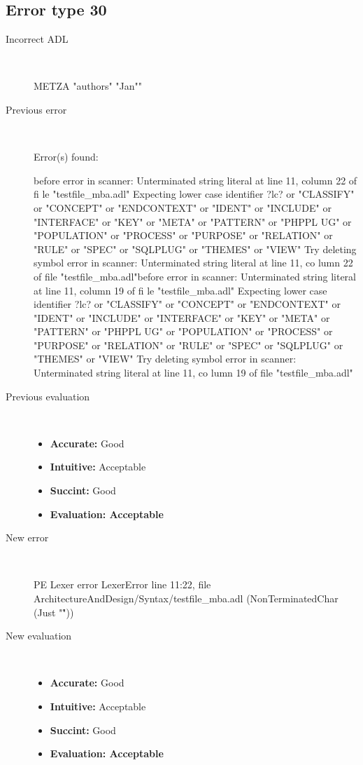 \hrulefill

\subsection{Error type 30}
  \begin{description}
  \item[Incorrect ADL]~\\
\begin{adl}
METZA "authors"  "Jan""\end{adl}
  \item[Previous error]~\\
\begin{haskell}
Error(s) found:

before error in scanner: Unterminated string literal at line 11, column 22 of fi
le "testfile_mba.adl"
Expecting lower case identifier ?lc? or "CLASSIFY" or "CONCEPT" or "ENDCONTEXT"
or "IDENT" or "INCLUDE" or "INTERFACE" or "KEY" or "META" or "PATTERN" or "PHPPL
UG" or "POPULATION" or "PROCESS" or "PURPOSE" or "RELATION" or "RULE" or "SPEC"
or "SQLPLUG" or "THEMES" or "VIEW"
Try deleting symbol error in scanner: Unterminated string literal at line 11, co
lumn 22 of file "testfile_mba.adl"before error in scanner: Unterminated string literal at line 11, column 19 of fi
le "testfile_mba.adl"
Expecting lower case identifier ?lc? or "CLASSIFY" or "CONCEPT" or "ENDCONTEXT"
or "IDENT" or "INCLUDE" or "INTERFACE" or "KEY" or "META" or "PATTERN" or "PHPPL
UG" or "POPULATION" or "PROCESS" or "PURPOSE" or "RELATION" or "RULE" or "SPEC"
or "SQLPLUG" or "THEMES" or "VIEW"
Try deleting symbol error in scanner: Unterminated string literal at line 11, co
lumn 19 of file "testfile_mba.adl"
\end{haskell}
  \item[Previous evaluation]~\\
    \begin{itemize}
    \item \textbf{Accurate:} Good
    \item \textbf{Intuitive:} Acceptable
    \item \textbf{Succint:} Good
    \item \textbf{Evaluation: Acceptable}
    \end{itemize}
  \item[New error]~\\
\begin{haskell}
PE Lexer error LexerError line 11:22, file ArchitectureAndDesign/Syntax/testfile_mba.adl (NonTerminatedChar (Just "\r"))\end{haskell}
  \item[New evaluation]~\\
    \begin{itemize}
    \item \textbf{Accurate:} Good
    \item \textbf{Intuitive:} Acceptable
    \item \textbf{Succint:} Good
    \item \textbf{Evaluation: Acceptable
}
    \end{itemize}
  \end{description}

